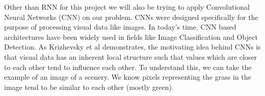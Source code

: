\documentclass[letterpaper, 12 pt, conference]{ieeeconf}  %
\begin{document}


Other than RNN for this project we will also be trying to apply Convolutional Neural Networks (CNN) on our problem. CNNs were designed specifically for the purpose of processing visual data like images. In today's time, CNN based architectures have been widely used in fields like Image Classification \cite{ilsvrc} and Object Detection. As Krizhevsky et al \cite{imagenet_original} demonstrates, the motivating idea behind CNNs is that visual data has an inherent local structure such that values which are closer to each other tend to influence each other. To understand this, we can take the example of an image of a scenery. We know pixels representing the grass in the image tend to be similar to each other (mostly green). 
\end{document}
